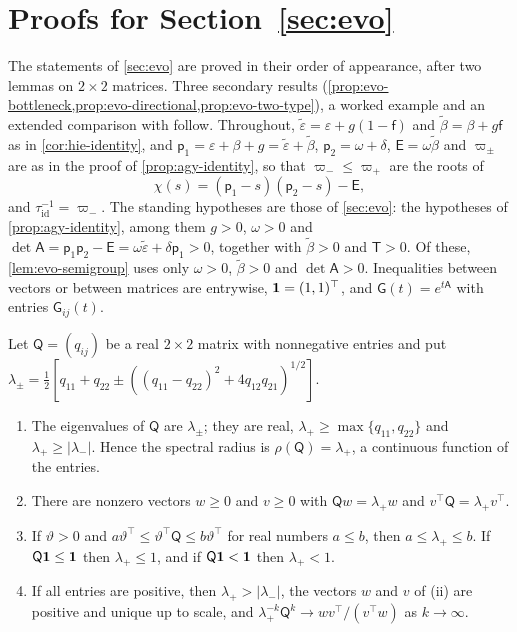 \section{Proofs for \texorpdfstring{Section~\ref{sec:evo}}{evolutionary individuality}}\label{app:evo}

The statements of \cref{sec:evo} are proved in their order of appearance, after two lemmas on $2\times2$ matrices. Three secondary results (\cref{prop:evo-bottleneck,prop:evo-directional,prop:evo-two-type}), a worked example and an extended comparison with \citet{bourrat2022tradeoff} follow. Throughout, $\tilde\varepsilon=\varepsilon+g(1-\mathsf f)$ and $\tilde\beta=\beta+g\mathsf f$ as in \cref{cor:hie-identity}, and $\mathsf p_1=\varepsilon+\beta+g=\tilde\varepsilon+\tilde\beta$, $\mathsf p_2=\omega+\delta$, $\mathsf E=\omega\tilde\beta$ and $\varpi_\pm$ are as in the proof of \cref{prop:agy-identity}, so that $\varpi_-\le\varpi_+$ are the roots of
\begin{equation}\label{eq:evo-charpoly}
\chi(s)=(\mathsf p_1-s)(\mathsf p_2-s)-\mathsf E,
\end{equation}
and $\tau_{\mathrm{id}}^{-1}=\varpi_-$. The standing hypotheses are those of \cref{sec:evo}: the hypotheses of \cref{prop:agy-identity}, among them $g>0$, $\omega>0$ and $\det\mathsf A=\mathsf p_1\mathsf p_2-\mathsf E=\omega\tilde\varepsilon+\delta\mathsf p_1>0$, together with $\tilde\beta>0$ and $\mathsf T>0$. Of these, \cref{lem:evo-semigroup} uses only $\omega>0$, $\tilde\beta>0$ and $\det\mathsf A>0$. Inequalities between vectors or between matrices are entrywise, $\mathbf{1}=(1,1)^\top$, and $\mathsf G(t)=e^{t\mathsf A}$ with entries $\mathsf G_{ij}(t)$.

\begin{lemma}\label{lem:evo-perron}
Let $\mathsf Q=(q_{ij})$ be a real $2\times2$ matrix with nonnegative entries and put $\lambda_\pm=\frac12[q_{11}+q_{22}\pm((q_{11}-q_{22})^2+4q_{12}q_{21})^{1/2}]$.
\begin{enumerate}
\item[(i)] The eigenvalues of $\mathsf Q$ are $\lambda_\pm$; they are real, $\lambda_+\ge\max\{q_{11},q_{22}\}$ and $\lambda_+\ge\lvert\lambda_-\rvert$. Hence the spectral radius is $\rho(\mathsf Q)=\lambda_+$, a continuous function of the entries.
\item[(ii)] There are nonzero vectors $w\ge0$ and $v\ge0$ with $\mathsf Qw=\lambda_+w$ and $v^\top\mathsf Q=\lambda_+v^\top$.
\item[(iii)] If $\vartheta>0$ and $a\vartheta^\top\le\vartheta^\top\mathsf Q\le b\vartheta^\top$ for real numbers $a\le b$, then $a\le\lambda_+\le b$. If $\mathsf Q\mathbf{1}\le\mathbf{1}$ then $\lambda_+\le1$, and if $\mathsf Q\mathbf{1}<\mathbf{1}$ then $\lambda_+<1$.
\item[(iv)] If all entries are positive, then $\lambda_+>\lvert\lambda_-\rvert$, the vectors $w$ and $v$ of (ii) are positive and unique up to scale, and $\lambda_+^{-k}\mathsf Q^k\to wv^\top/(v^\top w)$ as $k\to\infty$.
\end{enumerate}
\end{lemma}

